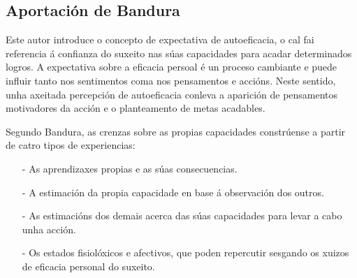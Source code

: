 \documentclass[a4paper,11pt]{article}
\begin{document}
\subsection{Aportación de Bandura}
Este autor introduce o concepto de expectativa de autoeficacia, o cal fai referencia á confianza do suxeito nas súas capacidades para acadar determinados logros. A expectativa sobre a eficacia persoal é un proceso cambiante e puede influir tanto nos sentimentos coma nos pensamentos e accións. Neste sentido, unha axeitada percepción de autoeficacia conleva a aparición de pensamentos motivadores da acción e o planteamento de metas acadables. 

Segundo Bandura, as crenzas sobre as propias capacidades constrúense a partir de catro tipos de experiencias:
\begin{itemize}
	\item[-] As aprendizaxes propias e as súas consecuencias.
	\item[-] A estimación da propia capacidade en base á observación dos outros.
	\item[-] As estimacións dos demais acerca das súas capacidades para levar a cabo unha acción.
	\item[-] Os estados fisiolóxicos e afectivos, que poden repercutir sesgando os xuizos de eficacia
	personal do suxeito.
\end{itemize}
\end{document}
